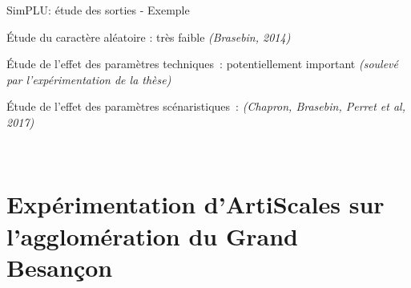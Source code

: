 \documentclass[xcolor=table]{beamer}
\newcommand\FontPetit{\fontsize{8}{6}\selectfont}
\begin{document}
\begin{frame}{SimPLU: étude des sorties - Exemple}
	\begin{block}{}
		Étude du caractère aléatoire : très faible \textit{(Brasebin, 2014)}
	\end{block}
	\begin{block}{}
		Étude de l'effet des paramètres techniques~: potentiellement important \textit{(soulevé par l'expérimentation de la thèse)}
	\end{block}
	\begin{block}{}
		Étude de l'effet des paramètres scénaristiques~: \textit{(Chapron, Brasebin, Perret et al, 2017)}
		
\end{block}
	\\
	\FontPetit\centering{\textit{ }}
\end{frame}




\section[Expérimentation]{Expérimentation d'ArtiScales sur l'agglomération du Grand Besançon}
\end{document}
